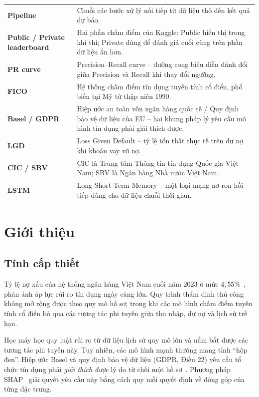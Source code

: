 \documentclass[12pt,a4paper,oneside]{report}
\theoremstyle{vnplain}
\theoremstyle{vndef}
\begin{document}
\begin{longtable}{>{\raggedright\arraybackslash\bfseries}p{4.1cm} p{10.1cm}}
Pipeline & Chuỗi các bước xử lý nối tiếp từ dữ liệu thô đến kết quả dự báo.\\
Public / Private leaderboard & Hai phần chấm điểm của Kaggle: Public hiển thị trong khi thi; Private dùng để đánh giá cuối cùng trên phần dữ liệu ẩn hơn.\\
PR curve & Precision--Recall curve -- đường cong biểu diễn đánh đổi giữa Precision và Recall khi thay đổi ngưỡng.\\
FICO & Hệ thống chấm điểm tín dụng tuyến tính cổ điển, phổ biến tại Mỹ từ thập niên 1990.\\
Basel / GDPR & Hiệp ước an toàn vốn ngân hàng quốc tế / Quy định bảo vệ dữ liệu của EU -- hai khung pháp lý yêu cầu mô hình tín dụng phải giải thích được.\\
LGD & Loss Given Default -- tỷ lệ tổn thất thực tế trên dư nợ khi khoản vay vỡ nợ.\\
CIC / SBV & CIC là Trung tâm Thông tin tín dụng Quốc gia Việt Nam; SBV là Ngân hàng Nhà nước Việt Nam.\\
LSTM & Long Short-Term Memory -- một loại mạng nơ-ron hồi tiếp dùng cho dữ liệu chuỗi thời gian.\\
\bottomrule
\end{longtable}

\cleardoublepage
{}

\chapter{Giới thiệu}\label{ch:gioithieu}

\section{Tính cấp thiết}
Tỷ lệ nợ xấu của hệ thống ngân hàng Việt Nam cuối năm 2023 ở mức $4{,}55\%$~\cite{sbv2024},
phản ánh áp lực rủi ro tín dụng ngày càng lớn. Quy trình thẩm định thủ công không mở rộng
được theo quy mô hồ sơ; trong khi các mô hình chấm điểm tuyến tính cổ điển bỏ qua các
tương tác phi tuyến giữa thu nhập, dư nợ và lịch sử trễ hạn.

Học máy học quy luật rủi ro từ dữ liệu lịch sử quy mô lớn và nắm bắt được các tương tác
phi tuyến này. Tuy nhiên, các mô hình mạnh thường mang tính ``hộp đen''. Hiệp ước Basel
và quy định bảo vệ dữ liệu (GDPR, Điều 22) yêu cầu tổ chức tín dụng phải \emph{giải thích
được} lý do từ chối một hồ sơ~\cite{bcbs2018,gdpr2018}. Phương pháp SHAP~\cite{lundberg2017}
giải quyết yêu cầu này bằng cách quy mỗi quyết định về đóng góp của từng đặc trưng.
\end{document}
